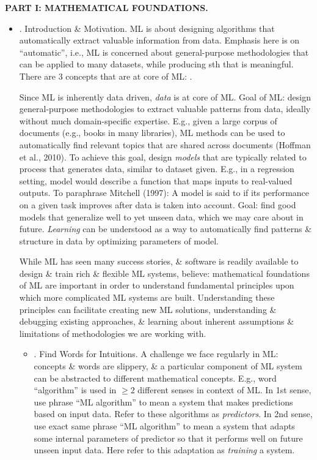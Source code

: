 \documentclass{article}
\begin{document}
{\bf PART I: MATHEMATICAL FOUNDATIONS.}
\begin{itemize}
	\item {. Introduction \& Motivation.} ML is about designing algorithms that automatically extract valuable information from data. Emphasis here is on ``automatic'', i.e., ML is concerned about general-purpose methodologies that can be applied to many datasets, while producing sth that is meaningful. There are 3 concepts that are at core of ML: .
	
	Since ML is inherently data driven, {\it data} is at core of ML. Goal of ML: design general-purpose methodologies to extract valuable patterns from data, ideally without much domain-specific expertise. E.g., given a large corpus of documents (e.g., books in many libraries), ML methods can be used to automatically find relevant topics that are shared across documents (Hoffman et al., 2010). To achieve this goal, design {\it models} that are typically related to process that generates data, similar to dataset given. E.g., in a regression setting, model would describe a function that maps inputs to real-valued outputs. To paraphrase Mitchell (1997): A model is said to  if its performance on a given task improves after data is taken into account. Goal: find good models that generalize well to yet unseen data, which we may care about in future. {\it Learning} can be understood as a way to automatically find patterns \& structure in data by optimizing parameters of model.
	
	While ML has seen many success stories, \& software is readily available to design \& train rich \& flexible ML systems, believe: mathematical foundations of ML are important in order to understand fundamental principles upon which more complicated ML systems are built. Understanding these principles can facilitate creating new ML solutions, understanding \& debugging existing approaches, \& learning about inherent assumptions \& limitations of methodologies we are working with.
	\begin{itemize}
		\item {. Find Words for Intuitions.} A challenge we face regularly in ML: concepts \& words are slippery, \& a particular component of ML system can be abstracted to different mathematical concepts. E.g., word ``algorithm'' is used in $\ge2$ different senses in context of ML. In 1st sense, use phrase ``ML algorithm'' to mean a system that makes predictions based on input data. Refer to these algorithms as {\it predictors}. In 2nd sense, use exact same phrase ``ML algorithm'' to mean a system that adapts some internal parameters of predictor so that it performs well on future unseen input data. Here refer to this adaptation as {\it training} a system.
		

\end{itemize}
\end{itemize}
\end{document}
